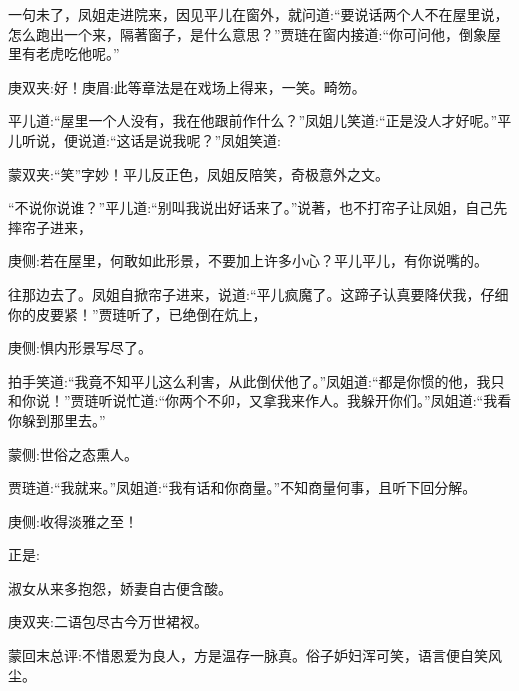 \begin{parag}
    一句未了，凤姐走进院来，因见平儿在窗外，就问道:“要说话两个人不在屋里说，怎么跑出一个来，隔著窗子，是什么意思？”贾琏在窗内接道:“你可问他，倒象屋里有老虎吃他呢。”\begin{note}庚双夹:好！庚眉:此等章法是在戏场上得来，一笑。畸笏。\end{note}平儿道:“屋里一个人没有，我在他跟前作什么？”凤姐儿笑道:“正是没人才好呢。”平儿听说，便说道:“这话是说我呢？”凤姐笑道:\begin{note}蒙双夹:“笑”字妙！平儿反正色，凤姐反陪笑，奇极意外之文。\end{note}“不说你说谁？”平儿道:“别叫我说出好话来了。”说著，也不打帘子让凤姐，自己先摔帘子进来，\begin{note}庚侧:若在屋里，何敢如此形景，不要加上许多小心？平儿平儿，有你说嘴的。\end{note}往那边去了。凤姐自掀帘子进来，说道:“平儿疯魔了。这蹄子认真要降伏我，仔细你的皮要紧！”贾琏听了，已绝倒在炕上，\begin{note}庚侧:惧内形景写尽了。\end{note}拍手笑道:“我竟不知平儿这么利害，从此倒伏他了。”凤姐道:“都是你惯的他，我只和你说！”贾琏听说忙道:“你两个不卯，又拿我来作人。我躲开你们。”凤姐道:“我看你躲到那里去。”\begin{note}蒙侧:世俗之态熏人。\end{note}贾琏道:“我就来。”凤姐道:“我有话和你商量。”不知商量何事，且听下回分解。\begin{note}庚侧:收得淡雅之至！\end{note}正是:
\end{parag}


\begin{poem}
    \begin{pl}淑女从来多抱怨，娇妻自古便含酸。\end{pl}
    \begin{note}庚双夹:二语包尽古今万世裙衩。\end{note}
\end{poem}


\begin{parag}
    \begin{note}蒙回末总评:不惜恩爱为良人，方是温存一脉真。俗子妒妇浑可笑，语言便自笑风尘。\end{note}
\end{parag}
